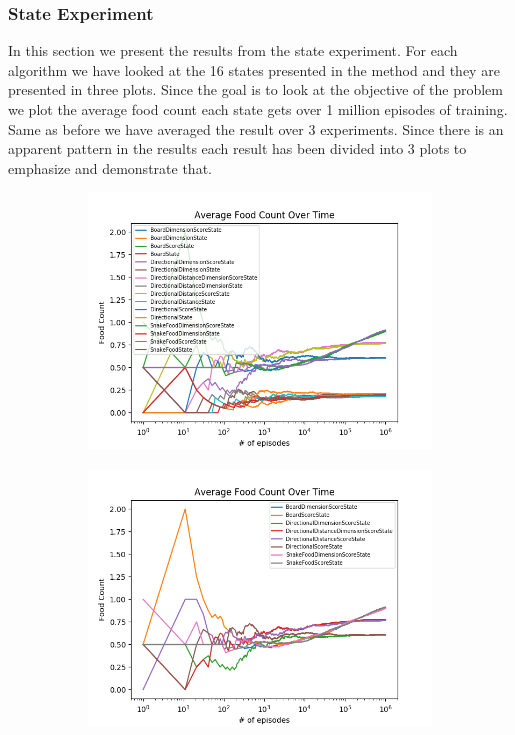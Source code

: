 \documentclass[result.tex]{subfiles}
\begin{document}
    \newpage

    \subsubsection*{State Experiment}

    In this section we present the results from the state experiment. For each algorithm we have looked at the 16 states presented in the method and they are presented in three plots. Since the goal is to look at the objective of the problem we plot the average food count each state gets over 1 million episodes of training. Same as before we have averaged the result over 3 experiments. Since there is an apparent pattern in the results each result has been divided into 3 plots to emphasize and demonstrate that.

    \begin{figure}[ht]
        \centering
        \begin{subfigure}[b]{.35\linewidth}
            \includegraphics[width=\linewidth]{../images/qlearning/state/234/all_average_food_count_over_time.png}
        \end{subfigure}
        \begin{subfigure}[b]{.35\linewidth}
            \includegraphics[width=\linewidth]{../images/qlearning/state/234/score_dim_average_food_count_over_time.png}
        \end{subfigure}


\end{figure}
\end{document}
